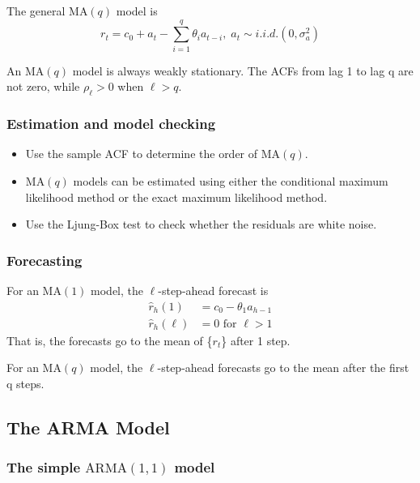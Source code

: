 \documentclass[a4paper,11pt]{article}
\begin{document}
The general \(\mathrm{MA}(q)\) model is
\begin{equation}
\label{eq-maq}
r_t = c_0 + a_t - \sum_{i=1}^q \theta_i a_{t-i},\; a_t \sim i.i.d.(0, \sigma^2_a)
\end{equation}

An \(\mathrm{MA}(q)\) model is always weakly stationary. The ACFs from
lag 1 to lag q are not zero, while \(\rho_{\ell} > 0\) when \(\ell > q\).

\subsubsection*{Estimation and model checking}
\label{sec:org8b76449}

\begin{itemize}
\item Use the sample ACF to determine the order of \(\mathrm{MA}(q)\).

\item \(\mathrm{MA}(q)\) models can be estimated using either the
conditional maximum likelihood method or the exact maximum
likelihood method.

\item Use the Ljung-Box test to check whether the residuals are white
noise.
\end{itemize}

\subsubsection*{Forecasting}
\label{sec:org9352721}

For an \(\mathrm{MA}(1)\) model, the \(\ell\)-step-ahead forecast is
\begin{align*}
\hat{r}_h(1) &= c_0 - \theta_1 a_{h-1} \\
\hat{r}_h(\ell) &= 0 \text{ for } \ell > 1
\end{align*}
That is, the forecasts go to the mean of \{\(r_t\)\} after 1 step.

For an \(\mathrm{MA}(q)\) model, the \(\ell\)-step-ahead forecasts go to
the mean after the first q steps.


\subsection{The ARMA Model}
\label{sec:org8cd90ac}

\subsubsection*{The simple \(\mathrm{ARMA}(1,1)\) model}
\label{sec:org25f564d}
\end{document}
